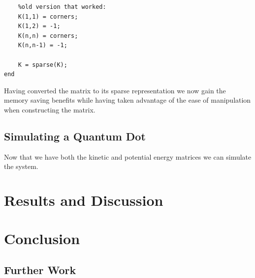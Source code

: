 \documentclass[authoryearcitations]{UoYCSproject}
\begin{document}
\begin{lstlisting}[caption={Second two parts of setting the coefficients}, label=lst:cetCoeff2, firstnumber=11]	
	%Ensure that the corners of the matrix are what we desire
	%old version that worked:
	K(1,1) = corners;
	K(1,2) = -1;
	K(n,n) = corners;
	K(n,n-1) = -1;
	
	K = sparse(K);
end	
\end{lstlisting}

Having converted the matrix to its sparse representation we now gain the memory saving benefits while having taken
advantage of the ease of manipulation when constructing the matrix. 


\section{Simulating a Quantum Dot}
Now that we have both the kinetic and potential energy matrices we can simulate the system. 


\chapter{Results and Discussion}

\chapter{Conclusion}



\section{Further Work}


\end{document}
